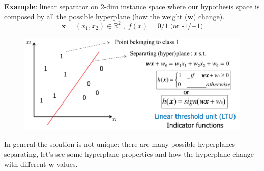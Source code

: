\documentclass[../main.tex]{subfiles}
\begin{document}
\textbf{Example}: linear separator on 2-dim instance space where our hypothesis space is composed by all the possible hyperplane (how the weight ($\mathbf{w}$) change).
$$\mathbf{x} = (x_1, x_2) \in \mathbb{R}^2 \;,\; f(x) = 0/1 \; \text{(or  -1/+1)}$$
\begin{figure}[H]
    \centering
    \includegraphics[scale = 0.3]{lectures/2_linear_model/2_linear_decision_boundary.png}
\end{figure}

In general the solution is not unique: there are many possible hyperplanes separating, let's see some hyperplane properties and how the hyperplane change with different $\mathbf{w}$ values.\\
\end{document}
